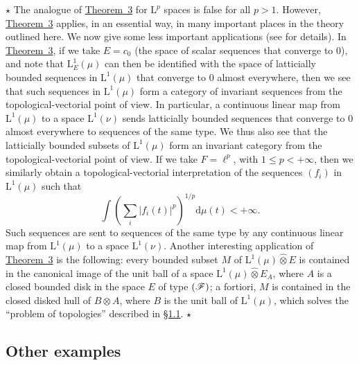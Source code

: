 \documentclass{article}
\theoremstyle{plain}
\newcommand{\aster}[1]{$\star${#1}$\star$}
\newcommand{\LL}{\mathrm{L}}
\renewcommand{\ll}{\ell}
\newcommand{\FF}{\mbox{\normalfont($\mathscr{F}$)}}
\newcommand{\hotimes}{\widehat{\otimes}}
\newcommand{\dd}{\mathrm{d}}
\begin{document}
\aster{
  The analogue of \hyperref[1.theorem3]{Theorem~3} for $\LL^p$ spaces is false for all $p>1$.
  However, \hyperref[1.theorem3]{Theorem~3} applies, in an essential way, in many important places in the theory outlined here.
  We now give some less important applications (see \cite[chap.~1, \S2, n\textsuperscript{o}~2]{PTT} for details).
  In \hyperref[1.theorem3]{Theorem~3}, if we take $E=c_0$ (the space of scalar sequences that converge to $0$), and note that $\LL_E^1(\mu)$ can then be identified with the space of latticially bounded sequences in $\LL^1(\mu)$ that converge to $0$ almost everywhere, then we see that such sequences in $\LL^1(\mu)$ form a category of invariant sequences from the topological-vectorial point of view.
  In particular, a continuous linear map from $\LL^1(\mu)$ to a space $\LL^1(\nu)$ sends latticially bounded sequences that converge to $0$ almost everywhere to sequences of the same type.
  We thus also see that the latticially bounded subsets of $\LL^1(\mu)$ form an invariant category from the topological-vectorial point of view.
  If we take $F=\ll^p$, with $1\leq p<+\infty$, then we similarly obtain a topological-vectorial interpretation of the sequences $(f_i)$ in $\LL^1(\mu)$ such that
  \[
    \int \left(
      \sum_i |f_i(t)|^p
    \right)^{1/p}
    \dd\mu(t) < +\infty.
  \]
  Such sequences are sent to sequences of the same type by any continuous linear map from $\LL^1(\mu)$ to a space $\LL^1(\nu)$.
  Another interesting application of \hyperref[1.theorem3]{Theorem~3} is the following: every bounded subset $M$ of $\LL^1(\mu)\hotimes E$ is contained in the canonical image of the unit ball of a space $\LL^1(\mu)\hotimes E_A$, where $A$ is a closed bounded disk in the space $E$ of type $\FF$;
  a fortiori, $M$ is contained in the closed disked hull of $B\otimes A$, where $B$ is the unit ball of $\LL^1(\mu)$, which solves the ``problem of topologies'' described in \hyperref[1.1]{\S1.1}.
}


\subsection{Other examples}
\label{1.4}
\end{document}
